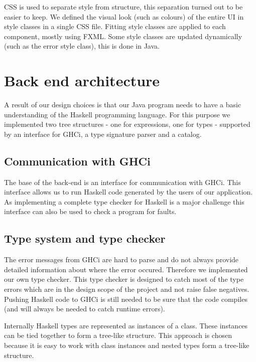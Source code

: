 CSS is used to separate style from structure, this separation turned out to be easier to keep. We defined the visual look (such as colours) of the entire UI in style classes in a single CSS file. Fitting style classes are applied to each component, mostly using FXML. Some style classes are updated dynamically (such as the error style class), this is done in Java.

\section{Back end architecture}

A result of our design choices is that our Java program needs to have a basic understanding of the Haskell programming
language. For this purpose we implemented two tree structures - one for expressions, one for types - supported by an
interface for GHCi, a type signature parser and a catalog.

\subsection{Communication with GHCi}
\label{GHCi}

The base of the back-end is an interface for communication with GHCi. This interface allows us to run Haskell code
generated by the users of our application. As implementing a complete type checker for Haskell is a major challenge this
interface can also be used to check a program for faults.

\subsection{Type system and type checker}

The error messages from GHCi are hard to parse and do not always provide detailed information about where the error
occured. Therefore we implemented our own type checker. This type checker is designed to catch most of the type errors 
which are in the design scope of the project and not raise false negatives. Pushing Haskell code to GHCi is still needed
to be sure that the code compiles (and will always be needed to catch runtime errors).

Internally Haskell types are represented as instances of a class. These instances can be tied together to form a
tree-like structure. This approach is chosen because it is easy to work with class instances and nested types form
a tree-like structure. 

